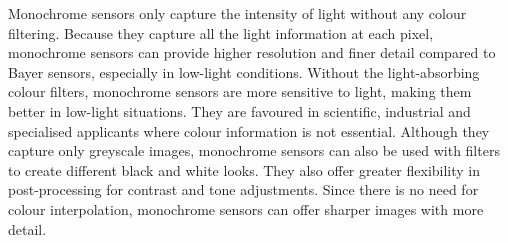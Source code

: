 \documentclass[10pt]{article}
\begin{document}
\begin{multicols}{2}
\newline \newline
Monochrome sensors only capture the intensity of light without any colour filtering. Because they capture all the light information at each pixel, monochrome sensors can provide higher resolution and finer detail compared to Bayer sensors, especially in low-light conditions.
Without the light-absorbing colour filters, monochrome sensors are more sensitive to light, making them better in low-light situations. They are favoured in scientific, industrial and specialised applicants where colour information is not essential.
Although they capture only greyscale images, monochrome sensors can also be used with filters to create different black and white looks. They also offer greater flexibility in post-processing for contrast and tone adjustments.
Since there is no need for colour interpolation, monochrome sensors can offer sharper images with more detail.


\end{multicols}
\end{document}
